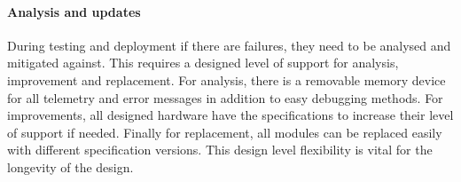 \paragraph{Analysis and updates}
During testing and deployment if there are failures, they need to be analysed and mitigated against. This requires a designed level of support for analysis, improvement and replacement. For analysis, there is a removable memory device for all telemetry and error messages in addition to easy debugging methods. For improvements, all designed hardware have the specifications to increase their level of support if needed. Finally for replacement, all modules can be replaced easily with different specification versions. This design level flexibility is vital for the longevity of the design.
